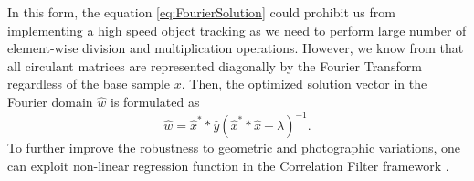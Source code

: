 \documentclass{bmvc2k}
\begin{document}

In this form, the equation \ref{eq:FourierSolution} could prohibit us
from implementing a high speed object tracking as we need to perform
large number of element-wise division and multiplication
operations. However, we know from \cite{gray2006toeplitz} that all
circulant matrices are represented diagonally by the Fourier Transform
regardless of the base sample $x$.
Then, the optimized solution vector in the Fourier domain $\hat{w}$ is formulated as
\begin{equation}
\hat{w} = \hat{x}^{*}*\hat{y}(\hat{x}^{*}*\hat{x}+\lambda)^{-1}.
\label{eq:DiagonalizedPrimalSolution}
\end{equation}
To further improve the robustness to geometric and photographic variations, one can exploit non-linear
regression function in the Correlation Filter framework \cite{henriques2015high}. 
\end{document}
